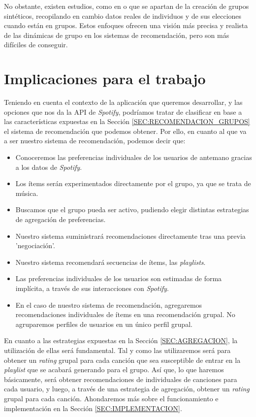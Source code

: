 No obstante, existen estudios, como en \cite{Senot2010Analysis} o \cite{Tran2019Interact} que se apartan de la creación de grupos sintéticos, recopilando en cambio datos reales de individuos y de sus elecciones cuando 
están en grupos. Estos enfoques ofrecen una visión más precisa y realista de las dinámicas de grupo en los sistemas de recomendación, pero son más difíciles de
conseguir.


\section{Implicaciones para el trabajo\label{SEC:DISCUSION_RECOMENDACION}}

Teniendo en cuenta el contexto de la aplicación que queremos desarrollar, y las opciones que nos da la API de \textit{Spotify}, podríamos tratar 
de clasificar en base a las características expuestas en la Sección \ref{SEC:RECOMENDACION_GRUPOS} el sistema de recomendación que podemos obtener. 
Por ello, en cuanto al que va a ser nuestro sistema de recomendación, podemos decir que:
\begin{itemize}
    \item Conoceremos las preferencias individuales de los usuarios de antemano gracias a los datos de \textit{Spotify}.
    \item Los ítems serán experimentados directamente por el grupo, ya que se trata de música.
    \item Buscamos que el grupo pueda ser activo, pudiendo elegir distintas estrategias de agregación de preferencias.
    \item Nuestro sistema suministrará recomendaciones directamente tras una previa 'negociación'.
    \item Nuestro sistema recomendará secuencias de ítems, las \textit{playlists}.
    \item Las preferencias individuales de los usuarios son estimadas de forma implícita, a través de sus interacciones con \textit{Spotify}.
    \item En el caso de nuestro sistema de recomendación, agregaremos recomendaciones individuales de ítems en una recomendación grupal. No agruparemos
    perfiles de usuarios en un único perfil grupal.
\end{itemize}

En cuanto a las estrategias expuestas en la Sección \ref{SEC:AGREGACION}, la utilización de ellas será fundamental. Tal y como las utilizaremos será para obtener
un \textit{rating} grupal para cada canción que sea susceptible de entrar en la \textit{playlist} que se acabará generando para el grupo. Así que, lo que haremos
básicamente, será obtener recomendaciones de individuales de canciones para cada usuario, y luego, a través de una estrategia de agregación, obtener un 
\textit{rating} grupal para cada canción. Ahondaremos más sobre el funcionamiento e implementación en la Sección \ref{SEC:IMPLEMENTACION}.